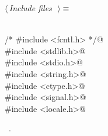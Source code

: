 \documentclass{report}
\begin{document}
\begin{flushleft} \small
\begin{minipage}{\linewidth} \label{scrap2}
$\langle\,${\it Include files}\nobreak\ {\footnotesize {}}$\,\rangle\equiv$
\vspace{-1ex}
\begin{list}{}{} \item
\mbox{}\verb@@\\
\mbox{}\verb@/* #include <fcntl.h> */@\\
\mbox{}\verb@#include <stdlib.h>@\\
\mbox{}\verb@#include <stdio.h>@\\
\mbox{}\verb@#include <string.h>@\\
\mbox{}\verb@#include <ctype.h>@\\
\mbox{}\verb@#include <signal.h>@\\
\mbox{}\verb@#include <locale.h>@\\
\mbox{}\verb@@{\NWsep}
\end{list}
\vspace{-1ex}
\footnotesize\addtolength{\baselineskip}{-1ex}
\begin{list}{}{\setlength{\itemsep}{-\parsep}\setlength{\itemindent}{-\leftmargin}}
\item \NWtxtMacroRefIn\ .
\end{list}
\vspace{-2ex}
\footnotesize\addtolength{\baselineskip}{-1ex}
\begin{list}{}{\setlength{\itemsep}{-\parsep}\setlength{\itemindent}{-\leftmargin}}

\end{list}
\end{minipage}
\end{flushleft}
\end{document}
